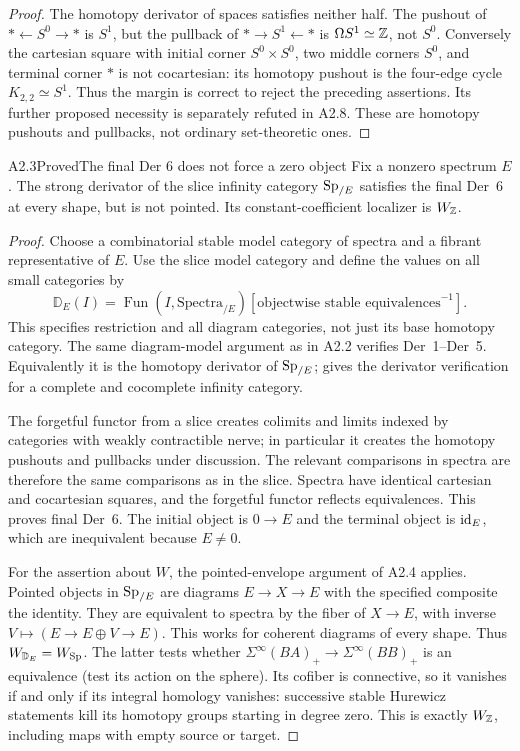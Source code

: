 \begin{proof}
The homotopy derivator of spaces satisfies neither half. The pushout of
$*\leftarrow S^0\to *$ is $S^1$, but the pullback of
$*\to S^1\leftarrow *$ is $\Omega S^1\simeq\mathbb Z$, not $S^0$. Conversely the
cartesian square with initial corner $S^0\times S^0$, two middle corners
$S^0$, and terminal corner $*$ is not cocartesian: its homotopy pushout is
the four-edge cycle $K_{2,2}\simeq S^1$. Thus the margin is correct to reject
the preceding assertions. Its further proposed necessity is separately
refuted in A2.8. These are homotopy pushouts and pullbacks, not ordinary
set-theoretic ones.
\end{proof}

\begin{claim}{A2.3}{Proved}{The final Der 6 does not force a zero object}
\label{A2-unpointed}
Fix a nonzero spectrum $E$. The strong derivator of the slice infinity
category $\mathrm{Sp}_{/E}$ satisfies the final Der~6 at every shape, but is not
pointed. Its constant-coefficient localizer is $W_{\mathbb Z}$.
\end{claim}
\begin{proof}
Choose a combinatorial stable model category of spectra and a fibrant
representative of $E$. Use the slice model category and define the values
on all small categories by
\[
 \mathbb D_E(I)=\operatorname{Fun}(I,\mathrm{Spectra}_{/E})
                     [\text{objectwise stable equivalences}^{-1}].
 \tag{A2.3.1}
\]
This specifies restriction and all diagram categories, not just its base
homotopy category. The same diagram-model argument as in A2.2 verifies
Der~1--Der~5. Equivalently it is the homotopy derivator of $\mathrm{Sp}_{/E}$;
\cite[Example~2.5]{A2GrothPontoShulman} gives the derivator verification
for a complete and cocomplete infinity category.

The forgetful functor from a slice creates colimits and limits indexed by
categories with weakly contractible nerve;
in particular it creates the homotopy pushouts and pullbacks under discussion.
The relevant comparisons in spectra are therefore the same comparisons
as in the slice. Spectra have identical cartesian and cocartesian squares,
and the forgetful functor reflects equivalences. This proves final Der~6.
The initial object is $0\to E$ and the terminal object is $\operatorname{id}_E$, which
are inequivalent because $E\ne0$.

For the assertion about $W$, the pointed-envelope argument of A2.4 applies.
Pointed objects in $\mathrm{Sp}_{/E}$ are diagrams $E\to X\to E$ with the specified
composite the identity. They are equivalent to spectra by the fiber of
$X\to E$, with inverse $V\mapsto(E\to E\oplus V\to E)$. This works for
coherent diagrams of every shape. Thus $W_{\mathbb D_E}=W_{\mathrm{Sp}}$.
The latter tests whether $\Sigma^\infty(BA)_+\to\Sigma^\infty(BB)_+$ is an
equivalence (test its action on the sphere). Its cofiber is connective, so
it vanishes if and only if its integral homology vanishes: successive
stable Hurewicz statements kill its homotopy groups starting in degree zero.
This is exactly $W_{\mathbb Z}$, including maps with empty source or target.
\end{proof}

